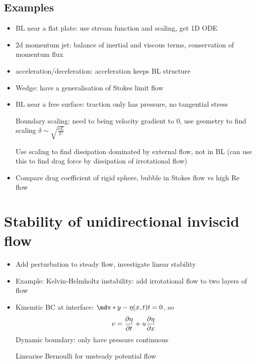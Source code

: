 \subsection*{Examples}
\begin{itemize}
    \item BL near a flat plate: use stream function and scaling, get 1D ODE
    \item 2d momentum jet: balance of inertial and viscous terms, conservation of momentum flux
    \item acceleration/deceleration: acceleration keeps BL structure
    \item Wedge: have a generalisation of Stokes limit flow
    \item BL near a free surface: traction only has pressure, no tangential stress
    
    Boundary scaling: need to being velocity gradient to $0$, use geometry to find scaling $\delta \sim \sqrt{\frac{\nu L}{U}}$

    Use scaling to find dissipation dominated by external flow, not in BL (can use this to find drag force by dissipation of irrotational flow)
    \item Compare drag coefficient of rigid sphere, bubble in Stokes flow vs high Re flow
\end{itemize} 

\section{Stability of unidirectional inviscid flow}
\begin{itemize}
    \item Add perturbation to steady flow, investigate linear stability
    \item Example: Kelvin-Helmholtz instability: add irrotational flow to two layers of flow
    \item Kinemtic BC at interface: $\mdv*{y-\eta(x,t)}{t} = 0$, so \[v = \frac{\partial{\eta}}{\partial{t}} + u\frac{\partial{\eta}}{\partial{x}} \]
    Dynamic boundary: only have pressure continuous

    Linearise Bernoulli for unsteady potential flow 
\end{itemize}
